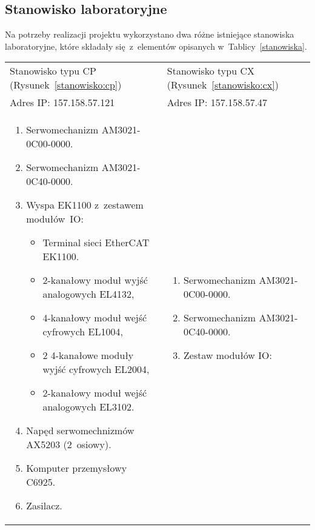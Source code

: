 \subsection{Stanowisko laboratoryjne}
Na potrzeby realizacji projektu wykorzystano dwa różne istniejące stanowiska laboratoryjne, które składały się~z~elementów opisanych w~Tablicy~\ref{stanowiska}.
\begin{table}[!htb]
\begin{center}
\begin{tabular}{| p{} | p{} |}\hline
Stanowisko typu CP (Rysunek~\ref{stanowisko:cp}) & Stanowisko typu CX (Rysunek~\ref{stanowisko:cx})  \\
Adres IP: 157.158.57.121 & Adres IP: 157.158.57.47  \\\hline
\begin{enumerate}[leftmargin=7mm]
\setlength{\itemsep}{5pt}
\setlength{\parskip}{0pt}
\setlength{\parsep}{0pt}
\item Serwomechanizm AM3021-0C00-0000.
\item Serwomechanizm AM3021-0C40-0000.
\item Wyspa EK1100 z~zestawem modułów~IO:
\begin{itemize}[leftmargin=3mm]
\setlength{\itemsep}{3pt}
\setlength{\parskip}{0pt}
\setlength{\parsep}{0pt}
\item Terminal sieci EtherCAT EK1100.
\item 2-kanałowy moduł wyjść analogowych EL4132,
\item 4-kanałowy moduł wejść cyfrowych EL1004,
\item 2 4-kanałowe moduły wyjść cyfrowych EL2004,
\item 2-kanałowy moduł wejść analogowych EL3102.
\end{itemize}
\item Napęd serwomechnizmów AX5203 (2~osiowy).
\item Komputer przemysłowy C6925.
\item Zasilacz.
\end{enumerate}
&
\begin{enumerate}[leftmargin=7mm]
\setlength{\itemsep}{5pt}
\setlength{\parskip}{0pt}
\setlength{\parsep}{0pt}
\item Serwomechanizm AM3021-0C00-0000.
\item Serwomechanizm AM3021-0C40-0000.
\item Zestaw modułów IO:
\begin{itemize}[leftmargin=3mm]
\setlength{\itemsep}{3pt}
\setlength{\parskip}{0pt}

\end{itemize}
\end{enumerate}
\end{tabular}
\end{center}
\end{table}
